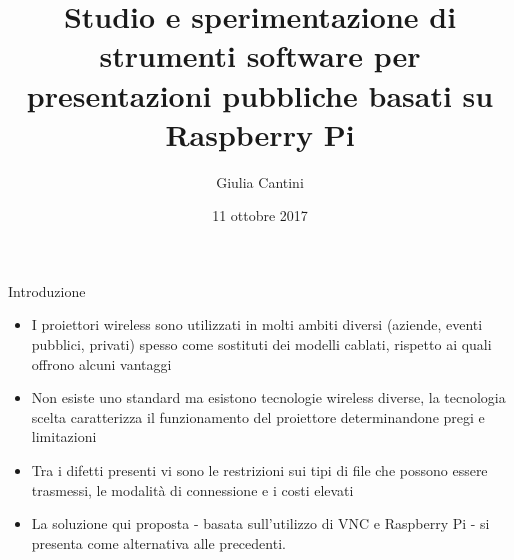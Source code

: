 \documentclass{beamer}
\author{Giulia Cantini}
\title{Studio e sperimentazione di strumenti software per presentazioni pubbliche basati su Raspberry Pi}
\date{11 ottobre 2017}
\begin{document}
\titlepageframe %

\begin{frame}[fragile]{Introduzione}

\begin{itemize}
    \item I proiettori wireless sono utilizzati in molti ambiti diversi (aziende, eventi pubblici, privati) spesso come sostituti dei modelli cablati, rispetto ai quali offrono alcuni vantaggi
    \item Non esiste uno standard ma esistono tecnologie wireless diverse, la tecnologia scelta caratterizza il funzionamento del proiettore determinandone pregi e limitazioni
    \item Tra i difetti presenti vi sono le restrizioni sui tipi di file che possono essere trasmessi, le modalità di connessione e i costi elevati
    \item La soluzione qui proposta - basata sull'utilizzo di VNC e Raspberry Pi - si presenta come alternativa alle precedenti.
\end{itemize}
\end{frame}
\end{document}
